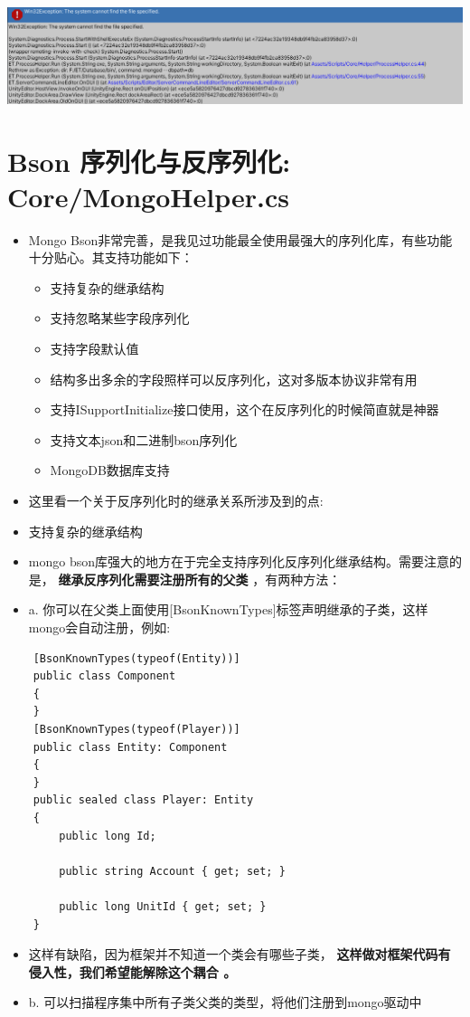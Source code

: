 \documentclass[9pt, b5paper]{article}
\begin{document}
\includegraphics[width=.9\linewidth]{./pic/readme_20230124_111807.png}

\section{Bson 序列化与反序列化: Core/MongoHelper.cs}
\label{sec-5}
\begin{itemize}
\item Mongo Bson非常完善，是我见过功能最全使用最强大的序列化库，有些功能十分贴心。其支持功能如下：
\begin{itemize}
\item 支持复杂的继承结构
\item 支持忽略某些字段序列化
\item 支持字段默认值
\item 结构多出多余的字段照样可以反序列化，这对多版本协议非常有用
\item 支持ISupportInitialize接口使用，这个在反序列化的时候简直就是神器
\item 支持文本json和二进制bson序列化
\item MongoDB数据库支持
\end{itemize}
\item 这里看一个关于反序列化时的继承关系所涉及到的点:
\item 支持复杂的继承结构
\item mongo bson库强大的地方在于完全支持序列化反序列化继承结构。需要注意的是， \textbf{继承反序列化需要注册所有的父类} ，有两种方法：
\item a. 你可以在父类上面使用[BsonKnownTypes]标签声明继承的子类，这样mongo会自动注册，例如:
\end{itemize}
\begin{verbatim}
    [BsonKnownTypes(typeof(Entity))]
    public class Component
    {
    }
    [BsonKnownTypes(typeof(Player))]
    public class Entity: Component
    {
    }
    public sealed class Player: Entity
    {
        public long Id;

        public string Account { get; set; }

        public long UnitId { get; set; }
    }
\end{verbatim}
\begin{itemize}
\item 这样有缺陷，因为框架并不知道一个类会有哪些子类， \textbf{这样做对框架代码有侵入性，我们希望能解除这个耦合 。}
\item b. 可以扫描程序集中所有子类父类的类型，将他们注册到mongo驱动中
\end{itemize}
\end{document}

